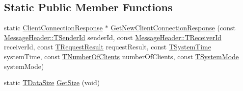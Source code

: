 \subsection*{Static Public Member Functions}
\begin{DoxyCompactItemize}
\item 
static \hyperlink{class_terra_swarm_1_1_asynchronous_1_1_client_connection_response}{Client\-Connection\-Response} $\ast$ \hyperlink{class_terra_swarm_1_1_asynchronous_1_1_client_connection_response_a5ecdefe1ecb557a0086f11f817db793d}{Get\-New\-Client\-Connection\-Response} (const \hyperlink{class_terra_swarm_1_1_message_header_a516b36855e2aad7cfbf8770f1b42784f}{Message\-Header\-::\-T\-Sender\-Id} sender\-Id, const \hyperlink{class_terra_swarm_1_1_message_header_aa3260702b182b6f88ddbdd3416e98df0}{Message\-Header\-::\-T\-Receiver\-Id} receiver\-Id, const \hyperlink{class_terra_swarm_1_1_asynchronous_1_1_client_connection_response_a55a4d4527b877bde0e74da223157a62a}{T\-Request\-Result} request\-Result, const \hyperlink{class_terra_swarm_1_1_asynchronous_1_1_client_connection_response_ac32ae5e652874b024aae5ed2f816c155}{T\-System\-Time} system\-Time, const \hyperlink{class_terra_swarm_1_1_asynchronous_1_1_client_connection_response_a0780de58d62395a3cce207fe96e43ccc}{T\-Number\-Of\-Clients} number\-Of\-Clients, const \hyperlink{class_terra_swarm_1_1_asynchronous_1_1_client_connection_response_ac34facba96c97e6897a1abd5ddd09159}{T\-System\-Mode} system\-Mode)
\item 
static \hyperlink{namespace_terra_swarm_a092e6ec9739175076ae3106783f5c1b6}{T\-Data\-Size} \hyperlink{class_terra_swarm_1_1_asynchronous_1_1_client_connection_response_ac5f405bd7621098cd4ca8d61242168ce}{Get\-Size} (void)
\end{DoxyCompactItemize}
